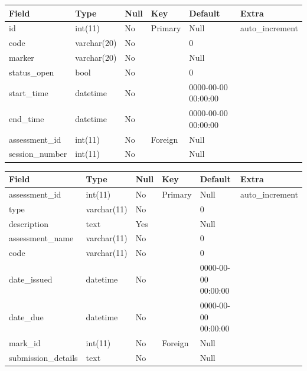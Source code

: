 \documentclass[12pt]{article}
\begin{document}
					\begin{tabular}{|p{1.0in}|p{0.9in}|p{0.5in}|p{0.4in}|p{1.0in}|p{1.1in}|} \hline
					Field & Type & Null & Key & Default & Extra \\ \hline
					id & int(11) & No & Primary & Null & auto\_increment \\ \hline
					code & varchar(20) & No &  & 0 &  \\ \hline
					marker & varchar(20) & No &  & Null &  \\ \hline
					status\_open & bool & No &  & 0 &  \\ \hline
					start\_time & datetime & No &  & 0000-00-00 00:00:00 &  \\ \hline
					end\_time & datetime & No &  & 0000-00-00 00:00:00 &  \\ \hline
					assessment\_id & int(11) & No & Foreign & Null &  \\ \hline
					session\_number & int(11) & No &  & Null &  \\ \hline
					\end{tabular}
					
					
					\newpage
					\begin{tabular}{|p{1.0in}|p{0.9in}|p{0.5in}|p{0.4in}|p{1.0in}|p{1.1in}|} \hline
					Field & Type & Null & Key & Default & Extra \\ \hline
					assessment\_id & int(11) & No & Primary & Null & auto\_increment \\ \hline
					type & varchar(11) & No &  & 0 &  \\ \hline
					description & text & Yes &  & Null &  \\ \hline
					assessment\_name & varchar(11) & No &  & 0 &  \\ \hline
					code & varchar(11) & No &  & 0 &  \\ \hline
					date\_issued & datetime & No &  & 0000-00-00 00:00:00 &  \\ \hline
					date\_due & datetime & No &  & 0000-00-00 00:00:00 &  \\ \hline
					mark\_id & int(11) & No & Foreign & Null &  \\ \hline
					submission\_details & text & No &  & Null &  \\ \hline
					\end{tabular}
					
\end{document}
